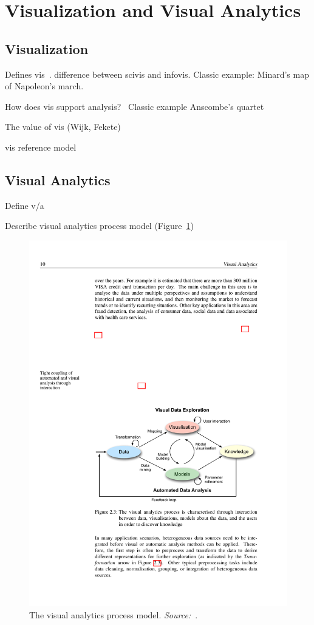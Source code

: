\section{Visualization and Visual Analytics}

\subsection{Visualization}
Defines vis~\cite{Munzner2014}. difference between scivis and infovis. Classic example: Minard's map of Napoleon's march.

How does vis support analysis?~\cite{Card1999} Classic example Anscombe's quartet

The value of vis (Wijk, Fekete)

vis reference model~\cite{Card1999}


\subsection{Visual Analytics}
Define v/a~\cite{Thomas2005, Keim2010}

Describe visual analytics process model (Figure~\ref{fig:visual-analytics-process})

\begin{figure}[!htb]
	\centering
	\includegraphics[width=\columnwidth]{visual-analytics-process}
	\caption{The visual analytics process model. \emph{Source:~\cite{Keim2010}}.}
	\label{fig:visual-analytics-process}
\end{figure}


